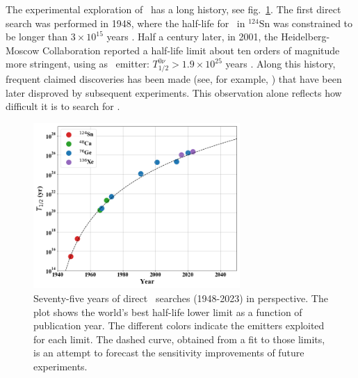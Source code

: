 

The experimental exploration of \bbonu\ has a long history, see fig.~\ref{fig:bb0nusearches}. The first direct search was performed in 1948, where the half-life for \bbonu\ in $^{124}\text{Sn}$ was constrained to be longer than $3\times 10^{15}$ years \cite{Barabash:2011mf}. Half a century later, in 2001, the Heidelberg-Moscow Collaboration reported a half-life limit about ten orders of magnitude more stringent, using  as \bb\ emitter: $T_{1/2}^{0\nu}>1.9\times 10^{25}$ years \cite{Klapdor-Kleingrothaus:2000eir}. Along this history, frequent claimed discoveries has been made (see, for example, \cite{Tretyak:2011pg}) that have been later disproved by subsequent experiments. This observation alone reflects how difficult it is to search for \bbonu.

\begin{figure}[t!b!]
\begin{center}
\includegraphics[width=0.70\textwidth]{img/bb0nusearches.png}
\end{center}
\caption{Seventy-five years of direct \bbonu\ searches (1948-2023) in perspective. The plot shows the world's best half-life lower limit as a function of publication year. The different colors indicate the \bb emitters exploited for each limit. The dashed curve, obtained from a fit to those limits, is an attempt to forecast the sensitivity improvements of future experiments.} \label{fig:bb0nusearches}
\end{figure}

